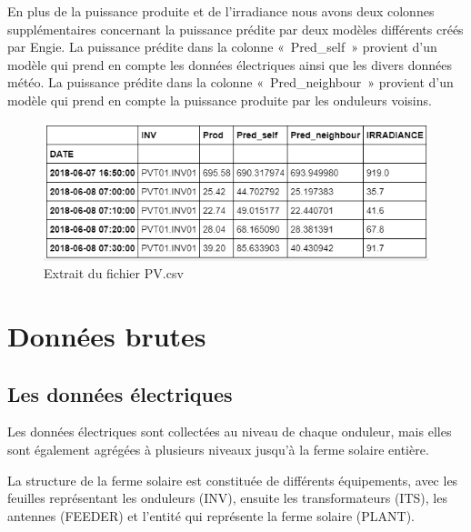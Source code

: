 En plus de la puissance produite et de l'irradiance nous avons deux colonnes supplémentaires concernant la puissance prédite par deux modèles différents créés par Engie.
La puissance prédite dans la colonne « Pred\_self » provient d'un modèle qui prend en compte les données électriques ainsi que les divers données météo. 
La puissance prédite dans la colonne « Pred\_neighbour » provient d'un modèle qui prend en compte la puissance produite par les onduleurs voisins. 

\begin{figure}[!ht]
\begin{center} \includegraphics[scale=0.8]{rapport/images/Ch51_PV_head.png} \end{center}
\caption{Extrait du fichier PV.csv}
\end{figure}

\newpage
\section{Données brutes}
\subsection{Les données électriques}

Les données électriques sont collectées au niveau de chaque onduleur, mais elles sont également agrégées à plusieurs niveaux jusqu'à la ferme solaire entière. 

La structure de la ferme solaire est constituée de différents équipements, avec les feuilles représentant les onduleurs (INV), ensuite les transformateurs (ITS), les antennes (FEEDER) et l'entité qui représente la ferme solaire (PLANT).

